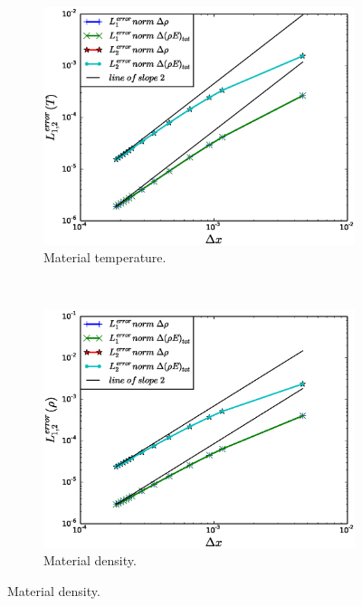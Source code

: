 \documentclass[times,doublespace]{fldauth}%
\begin{document}
\begin{figure}[h]
    \begin{subfigure}{0.5\textwidth}
    \centering
    \includegraphics[width=\linewidth]{figures/cst-xs/mach-1p05/mass-energy-diff-mat-temp-convergence.eps}
    \caption{Material temperature.}\label{fig:mach-1p05-cst-xs-temp-conv}
    \end{subfigure}
    ~
    \begin{subfigure}{0.5\textwidth}
    \centering
    \includegraphics[width=\linewidth]{figures/cst-xs/mach-1p05/mass-energy-diff-density-convergence.eps}
    \caption{Material density.}\label{fig:mach-1p05-cst-xs-density-conv}
    \end{subfigure}
    

\end{figure}
\end{document}

